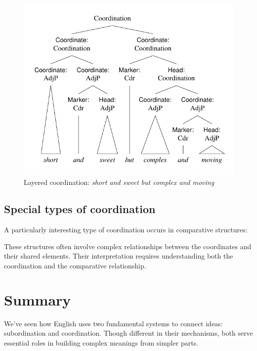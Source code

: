\begin{figure}
    \centering
    \includegraphics[width=0.9\linewidth]{figures/short and sweet but complex and moving.pdf}
    \caption{Layered coordination: \textit{short and sweet but complex and moving}}\label{fig:coord-layered}
\end{figure}


\subsection{Special types of coordination}

A particularly interesting type of coordination occurs in comparative structures:

\ea \label{ex:coord-comp}
    \z
\z

These structures often involve complex relationships between the coordinates and their shared elements. Their interpretation requires understanding both the coordination and the comparative relationship.

\section{Summary}

We've seen how English uses two fundamental systems to connect ideas: subordination and coordination. Though different in their mechanisms, both serve essential roles in building complex meanings from simpler parts.


